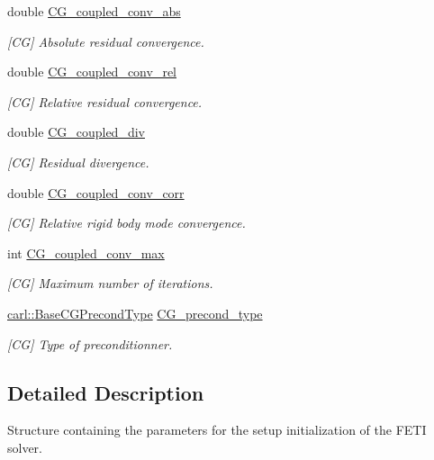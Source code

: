 \begin{DoxyCompactItemize}
double \hyperlink{structcarl_1_1feti__iterate__params_a60effd55cacd7ea048aef5d603d7b763}{C\+G\+\_\+coupled\+\_\+conv\+\_\+abs}
\begin{DoxyCompactList}\small\item\em \mbox{[}C\+G\mbox{]} Absolute residual convergence. \end{DoxyCompactList}\item 
double \hyperlink{structcarl_1_1feti__iterate__params_a27dca64808ece87470d8b3c8e29f1209}{C\+G\+\_\+coupled\+\_\+conv\+\_\+rel}
\begin{DoxyCompactList}\small\item\em \mbox{[}C\+G\mbox{]} Relative residual convergence. \end{DoxyCompactList}\item 
double \hyperlink{structcarl_1_1feti__iterate__params_aa6c49632bdf6096cdc8d6e960d269484}{C\+G\+\_\+coupled\+\_\+div}
\begin{DoxyCompactList}\small\item\em \mbox{[}C\+G\mbox{]} Residual divergence. \end{DoxyCompactList}\item 
double \hyperlink{structcarl_1_1feti__iterate__params_ac059145cfe8efc1f101e3dca789cf74d}{C\+G\+\_\+coupled\+\_\+conv\+\_\+corr}
\begin{DoxyCompactList}\small\item\em \mbox{[}C\+G\mbox{]} Relative rigid body mode convergence. \end{DoxyCompactList}\item 
int \hyperlink{structcarl_1_1feti__iterate__params_a84ca6f789614c1f57bd00256706f6180}{C\+G\+\_\+coupled\+\_\+conv\+\_\+max}
\begin{DoxyCompactList}\small\item\em \mbox{[}C\+G\mbox{]} Maximum number of iterations. \end{DoxyCompactList}\item 
\hyperlink{namespacecarl_ad52f21755b51ffa926038b59ae194ea8}{carl\+::\+Base\+C\+G\+Precond\+Type} \hyperlink{structcarl_1_1feti__iterate__params_ac48e02bc42d7a5e3f3a0f70418fbae10}{C\+G\+\_\+precond\+\_\+type}
\begin{DoxyCompactList}\small\item\em \mbox{[}C\+G\mbox{]} Type of preconditionner. \end{DoxyCompactList}\end{DoxyCompactItemize}


\subsection{Detailed Description}
Structure containing the parameters for the setup initialization of the F\+E\+T\+I solver. 

